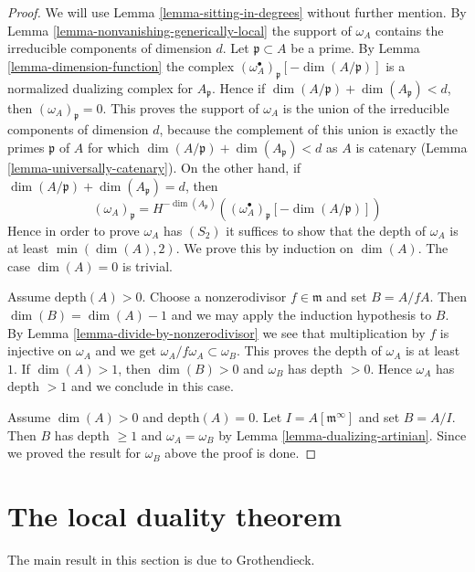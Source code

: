 \begin{proof}
We will use Lemma \ref{lemma-sitting-in-degrees} without further mention.
By Lemma \ref{lemma-nonvanishing-generically-local} the support
of $\omega_A$ contains the irreducible components of dimension $d$.
Let $\mathfrak p \subset A$ be a prime. By Lemma \ref{lemma-dimension-function}
the complex $(\omega_A^\bullet)_{\mathfrak p}[-\dim(A/\mathfrak p)]$
is a normalized dualizing complex for $A_\mathfrak p$. Hence if
$\dim(A/\mathfrak p) + \dim(A_\mathfrak p) < d$, then
$(\omega_A)_\mathfrak p = 0$.
This proves the support of $\omega_A$ is the union of the irreducible
components of dimension $d$, because the complement of this union
is exactly the primes $\mathfrak p$ of $A$ for which
$\dim(A/\mathfrak p) + \dim(A_\mathfrak p) < d$ as $A$ is catenary
(Lemma \ref{lemma-universally-catenary}).
On the other hand, if $\dim(A/\mathfrak p) + \dim(A_\mathfrak p) = d$, then
$$
(\omega_A)_\mathfrak p =
H^{-\dim(A_\mathfrak p)}\left(
(\omega_A^\bullet)_{\mathfrak p}[-\dim(A/\mathfrak p)] \right)
$$
Hence in order to prove $\omega_A$ has $(S_2)$ it suffices to show that
the depth of $\omega_A$ is at least $\min(\dim(A), 2)$.
We prove this by induction on $\dim(A)$. The case $\dim(A) = 0$ is
trivial.

\medskip\noindent
Assume $\text{depth}(A) > 0$. Choose a nonzerodivisor $f \in \mathfrak m$
and set $B = A/fA$. Then $\dim(B) = \dim(A) - 1$ and we may apply the
induction hypothesis to $B$. By Lemma \ref{lemma-divide-by-nonzerodivisor}
we see that multiplication by $f$ is injective on $\omega_A$ and we get
$\omega_A/f\omega_A \subset \omega_B$. This proves the depth of $\omega_A$
is at least $1$. If $\dim(A) > 1$, then $\dim(B) > 0$ and $\omega_B$
has depth $ > 0$. Hence $\omega_A$ has depth $> 1$ and we conclude in
this case.

\medskip\noindent
Assume $\dim(A) > 0$ and $\text{depth}(A) = 0$. Let
$I = A[\mathfrak m^\infty]$ and set $B = A/I$. Then $B$ has
depth $\geq 1$ and $\omega_A = \omega_B$ by
Lemma \ref{lemma-dualizing-artinian}.
Since we proved the result for $\omega_B$ above the proof is done.
\end{proof}





\section{The local duality theorem}
\label{section-local-duality}

\noindent
The main result in this section is due to Grothendieck.

